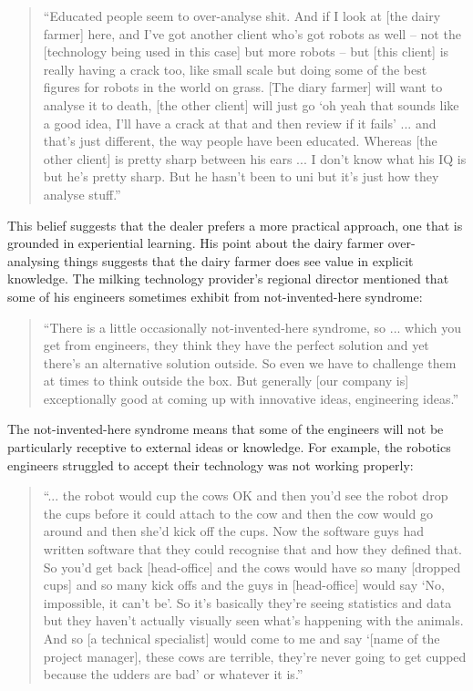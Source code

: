 \begin{quote}
\small
\enquote{Educated people seem to over-analyse shit. And if I look at [the dairy farmer] here, and I've got another client who's got robots as well – not the [technology being used in this case] but more robots – but [this client] is really having a crack too, like small scale but doing some of the best figures for robots in the world on grass. [The diary farmer] will want to analyse it to death, [the other client] will just go \enquote{oh yeah that sounds like a good idea, I'll have a crack at that and then review if it fails} ... and that's just different, the way people have been educated.  Whereas [the other client] is pretty sharp between his ears ... I don’t know what his IQ is but he's pretty sharp. But he hasn't been to uni but it's just how they analyse stuff.} \\
\end{quote}

This belief suggests that the dealer prefers a more practical approach, one that is grounded in experiential learning. His point about the dairy farmer over-analysing things suggests that the dairy farmer does see value in explicit knowledge. The milking technology provider's regional director mentioned that some of his engineers sometimes exhibit from not-invented-here syndrome:

\begin{quote}
\small
\enquote{There is a little occasionally not-invented-here syndrome, so ... which you get from engineers, they think they have the perfect solution and yet there's an alternative solution outside. So even we have to challenge them at times to think outside the box. But generally [our company is] exceptionally good at coming up with innovative ideas, engineering ideas.} \\
\end{quote}

The not-invented-here syndrome means that some of the engineers will not be particularly receptive to external ideas or knowledge. For example, the robotics engineers struggled to accept their technology was not working properly:  

\begin{quote}
\small
\enquote{... the robot would cup the cows OK and then you'd see the robot drop the cups before it could attach to the cow and then the cow would go around and then she'd kick off the cups. Now the software guys had written software that they could recognise that and how they defined that. So you'd get back [head-office] and the cows would have so many [dropped cups] and so many kick offs and the guys in [head-office] would say \enquote{No, impossible, it can't be}. So it's basically they're seeing statistics and data but they haven't actually visually seen what's happening with the animals. And so [a technical specialist] would come to me and say \enquote{[name of the project manager], these cows are terrible, they're never going to get cupped because the udders are bad} or whatever it is.} \\
\end{quote}

